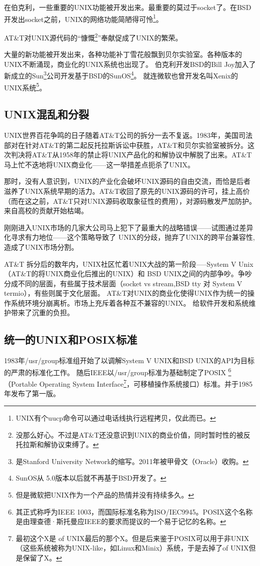 在伯克利，一些重要的UNIX功能被开发出来。最重要的莫过于socket了。在BSD开发出socket之前，UNIX的网络功能简陋得可怜\footnote{UNIX有个uucp命令可以通过电话线执行远程拷贝，仅此而已。}。


AT\&T对UNIX源代码的“慷慨\footnote{没那么好心。不过是AT\&T还没意识到UNIX的商业价值，同时暂时性的被反托拉斯和解协议束缚了。}”奉献促成了UNIX的繁荣。

大量的新功能被开发出来，各种功能补丁雪花般飘到贝尔实验室。各种版本的UNIX不断涌现，商业化的UNIX系统也出现了。
伯克利开发BSD的Bill Joy加入了新成立的Sun\footnote{是Stanford University Network的缩写。2011年被甲骨文（Oracle）收购。}公司开发基于BSD的SunOS\footnote{SunOS从 5.0版本以后就不再基于BSD开发了。}。
就连微软也曾开发名叫Xenix的UNIX系统\footnote{但是微软把UNIX作为一个产品的热情并没有持续多久。}。


\subsection{UNIX混乱和分裂}

UNIX世界百花争鸣的日子随着AT\&T公司的拆分一去不复返。1983年，美国司法部对在针对AT\&T的第二起反托拉斯诉讼中获胜，AT\&T和贝尔实验室被拆分。这次判决将AT\&T从1958年的禁止将UNIX产品化的和解协议中解脱了出来。AT\&T马上忙不迭地将UNIX商业化------这一举措差点扼杀了UNIX。

那时，没有人意识到，UNIX的产业化会破坏UNIX源码的自由交流，而恰是后者滋养了UNIX系统早期的活力。AT\&T收回了原先的UNIX源码的许可，挂上高价（而在这之前，AT\&T只对UNIX源码收取象征性的费用），对源码散发严加防护。来自高校的贡献开始枯竭。

刚刚进入UNIX市场的几家大公司马上犯下了最重大的战略错误------试图通过差异化寻求有力地位------这个策略导致了
UNIX的分歧，抛弃了UNIX的跨平台兼容性,造成了UNIX市场分割。

AT\&T 拆分后的数年内，UNIX社区忙着UNIX大战的第一阶段-----System V Unix（AT\&T的将UNIX商业化后推出的UNIX）和 BSD UNIX之间的内部争吵。争吵分成不同的层面，有些属于技术层面（socket vs stream,BSD tty 对 System V termio），有些则属于文化层面。
AT\&T对UNIX的商业化使得UNIX作为统一的操作系统环境分崩离析。市场上充斥着各种互不兼容的UNIX。
给软件开发和系统维护带来了沉重的负担。

\subsection{统一的UNIX和POSIX标准}

1983年/usr/group标准组开始了以调解System V UNIX和BSD UNIX的API为目标的严肃的标准化工作。
随后IEEE以/usr/group标准为基础制定了POSIX
\footnote{其正式称呼为IEEE 1003，而国际标准名称为ISO/IEC9945。POSIX这个名称是由理查德·斯托曼应IEEE的要求而提议的一个易于记忆的名称。}
（Portable Operating System Interface\footnote{最初这个X是 of UNIX最后的那个X。但是后来鉴于POSIX可以用于非UNIX（这些系统被称为UNIX-like，如Linux和Minix）系统，于是去掉了of UNIX但是保留了X。 }，可移植操作系统接口）标准。并于1985年发布了第一版。

